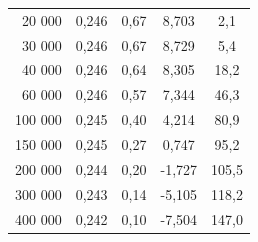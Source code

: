 \documentclass[a4paper, czech]{article}
\begin{document}
\begin{table}[H]
\begin{tabular}{rcccc}
        20 000      & 0,246                                                                       & 0,67                           & 8,703                                                        & 2,1                                                         \\
        30 000      & 0,246                                                                       & 0,67                           & 8,729                                                        & 5,4                                                         \\
        40 000      & 0,246                                                                       & 0,64                           & 8,305                                                        & 18,2                                                        \\
        60 000      & 0,246                                                                       & 0,57                           & 7,344                                                        & 46,3                                                        \\
        100 000     & 0,245                                                                       & 0,40                           & 4,214                                                        & 80,9                                                        \\
        150 000     & 0,245                                                                       & 0,27                           & 0,747                                                        & 95,2                                                        \\
        200 000     & 0,244                                                                       & 0,20                           & -1,727                                                       & 105,5                                                       \\
        300 000     & 0,243                                                                       & 0,14                           & -5,105                                                       & 118,2                                                       \\
        400 000     & 0,242                                                                       & 0,10                           & -7,504                                                       & 147,0                                                       \\

\end{tabular}
\end{table}
\end{document}

